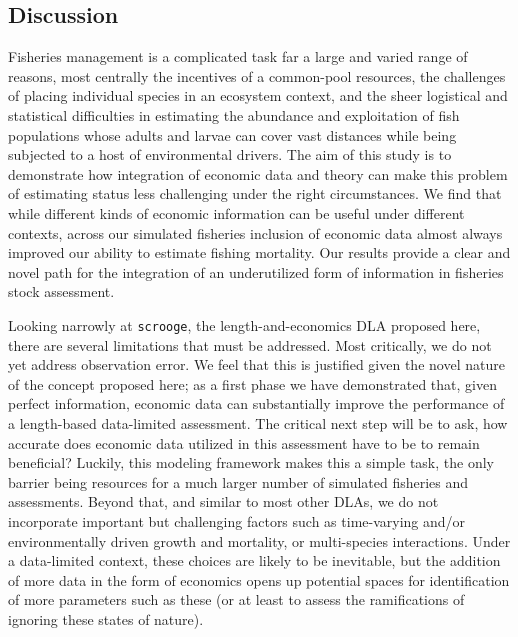 \documentclass[twoside,12pt,final]{ucthesis-CA2012}
\begin{document}
\begin{ucmainmatter}
\section{Discussion}\label{discussion-2}

Fisheries management is a complicated task far a large and varied range
of reasons, most centrally the incentives of a common-pool resources,
the challenges of placing individual species in an ecosystem context,
and the sheer logistical and statistical difficulties in estimating the
abundance and exploitation of fish populations whose adults and larvae
can cover vast distances while being subjected to a host of
environmental drivers. The aim of this study is to demonstrate how
integration of economic data and theory can make this problem of
estimating status less challenging under the right circumstances. We
find that while different kinds of economic information can be useful
under different contexts, across our simulated fisheries inclusion of
economic data almost always improved our ability to estimate fishing
mortality. Our results provide a clear and novel path for the
integration of an underutilized form of information in fisheries stock
assessment.

Looking narrowly at \texttt{scrooge}, the length-and-economics DLA
proposed here, there are several limitations that must be addressed.
Most critically, we do not yet address observation error. We feel that
this is justified given the novel nature of the concept proposed here;
as a first phase we have demonstrated that, given perfect information,
economic data can substantially improve the performance of a
length-based data-limited assessment. The critical next step will be to
ask, how accurate does economic data utilized in this assessment have to
be to remain beneficial? Luckily, this modeling framework makes this a
simple task, the only barrier being resources for a much larger number
of simulated fisheries and assessments. Beyond that, and similar to most
other DLAs, we do not incorporate important but challenging factors such
as time-varying and/or environmentally driven growth and mortality, or
multi-species interactions. Under a data-limited context, these choices
are likely to be inevitable, but the addition of more data in the form
of economics opens up potential spaces for identification of more
parameters such as these (or at least to assess the ramifications of
ignoring these states of nature).


\end{ucmainmatter}
\end{document}
